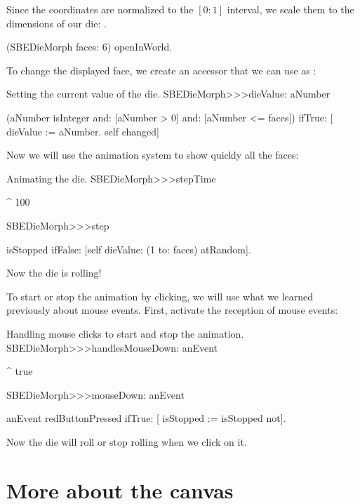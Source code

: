 \documentclass[a4paper,10pt,twoside]{book}
\begin{document}
Since the coordinates are normalized to the $[0{:}1]$ interval, we scale them to the dimensions of our die: .

\begin{code}{}
(SBEDieMorph faces: 6) openInWorld.
\end{code}

To change the displayed face, we create an accessor that we can use as :
\begin{method}{Setting the current value of the die.}
SBEDieMorph>>>dieValue: aNumber

	(aNumber isInteger
			and: [aNumber > 0]
			and: [aNumber <= faces])
		ifTrue: [
			dieValue := aNumber.
			self changed]
\end{method}

Now we will use the animation system to show quickly all the faces:
\begin{methods}{Animating the die.}
SBEDieMorph>>>stepTime

	^ 100


SBEDieMorph>>>step

	isStopped ifFalse: [self dieValue: (1 to: faces) atRandom].
\end{methods}
Now the die is rolling!

To start or stop the animation by clicking, we will use what we learned previously about mouse events.
First, activate the reception of mouse events:

\begin{methods}{Handling mouse clicks to start and stop the animation.}
SBEDieMorph>>>handlesMouseDown: anEvent

	^ true


SBEDieMorph>>>mouseDown: anEvent

	anEvent redButtonPressed ifTrue: [
		isStopped := isStopped not].
\end{methods}
Now the die will roll or stop rolling when we click on it.


\section{More about the canvas}
\end{document}

